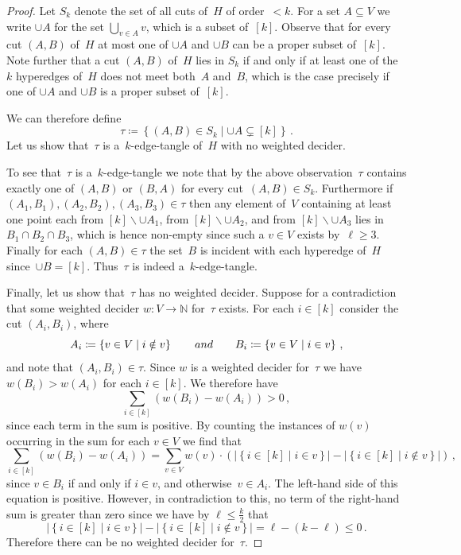 \documentclass[11pt]{article}
\theoremstyle{definition}
\newcommand{\N}{\mathbb{N}}
\newcommand{\sub}{\subseteq}
\def\sm{\smallsetminus}
\newcommand{\braces}[1]{\left(#1\right)}
\newcommand{\menge}[1]{\left\{#1\right\}}
\newcommand{\abs}[1]{\left |#1\right |}
\begin{document}
\begin{proof}
	Let $ S_k $ denote the set of all cuts of~$ H $ of order~$ <k $. For a set $ A\sub V $ we write $ \cup A $ for the set $ \bigcup_{v\in A}v $, which is a subset of~$ [k] $. Observe that for every cut $ (A,B) $ of~$ H $ at most one of $ \cup A $ and $ \cup B $ can be a proper subset of~$ [k] $. Note further that a cut $ (A,B) $ of~$ H $ lies in $ S_k $ if and only if at least one of the~$ k $ hyperedges of~$ H $ does not meet both~$ A $ and~$ B $, which is the case precisely if one of $ \cup A $ and $ \cup B $ is a proper subset of~$ [k] $.
	
	We can therefore define
	\[ \tau\coloneqq\menge{(A,B)\in S_k\mid \cup A\subsetneq[k]}\,. \]
	Let us show that~$ \tau $ is a~$ k $-edge-tangle of~$ H $ with no weighted decider.
	
	To see that~$ \tau $ is a~$ k $-edge-tangle we note that by the above observation~$ \tau $ contains exactly one of $ (A,B) $ or $ (B,A) $ for every cut~$ (A,B)\in S_k $. Furthermore if $ (A_1,B_1),(A_2,B_2),(A_3,B_3)\in\tau $ then any element of~$ V $ containing at least one point each from $ [k]\sm\cup A_1 $, from $ [k]\sm\cup A_2 $, and from $ [k]\sm\cup A_3 $ lies in $ B_1\cap B_2\cap B_3 $, which is hence non-empty since such a $ v\in V $ exists by~$ \ell\ge 3 $. Finally for each $ (A,B)\in\tau $ the set~$ B $ is incident with each hyperedge of~$ H $ since~$ \cup B=[k] $. Thus~$ \tau $ is indeed a~$ k $-edge-tangle.
	
	Finally, let us show that~$ \tau $ has no weighted decider. Suppose for a contradiction that some weighted decider $ w\colon V\to\N $ for~$ \tau $ exists. For each $ i\in[k] $ consider the cut $ (A_i,B_i) $, where
	\[ A_i\coloneqq\menge{v\in V\mid i\notin v}\qquad\textnormal{ and }\qquad B_i\coloneqq\menge{v\in V\mid i\in v}\,, \]
	and note that $ (A_i,B_i)\in\tau $. Since $ w $ is a weighted decider for~$ \tau $ we have $ w(B_i)>w(A_i) $ for each $ i\in[k] $. We therefore have
	\[ \sum_{i\in[k]}(w(B_i)-w(A_i))>0\,, \]
	since each term in the sum is positive. By counting the instances of $ w(v) $ occurring in the sum for each $ v\in V $ we find that 
	\[ \sum_{i\in[k]}(w(B_i)-w(A_i))=\sum_{v\in V}w(v)\cdot\braces{\abs{\menge{i\in[k]\mid i\in v}}-\abs{\menge{i\in[k]\mid i\notin v}}}\,, \]
	since $ v\in B_i $ if and only if $ i\in v $, and otherwise~$ v\in A_i $. The left-hand side of this equation is positive. However, in contradiction to this, no term of the right-hand sum is greater than zero since we have by $ \ell\le\frac{k}{2} $ that
	\[ \abs{\menge{i\in[k]\mid i\in v}}-\abs{\menge{i\in[k]\mid i\notin v}}=\ell-(k-\ell)\le 0\,. \]
	Therefore there can be no weighted decider for~$ \tau $.
\end{proof}
\end{document}
